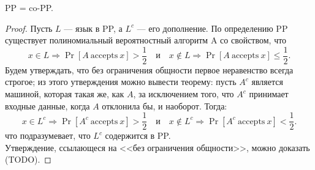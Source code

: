     \begin{Thm}
        PP = co-PP.
    \end{Thm}
    \begin{proof}
        Пусть $L$ --- язык в PP, а $L^c$ --- его дополнение. По определению PP существует полиномиальный вероятностный алгоритм A со свойством, что
        $$x \in L \Rightarrow \Pr [A \ {\text{accepts}} \ x] > {\frac{1}{2}} \quad {\text{и}} \quad x \not \in L \Rightarrow \Pr [A \ {\text{accepts}} \ x] \leq {\frac{1}{2}}.$$
        Будем утверждать, что без ограничения общности первое неравенство всегда строгое; из этого утверждения можно вывести теорему: пусть $A^{c}$ является машиной, которая такая же, как $A$, за исключением того, что $A^{c}$ принимает входные данные, когда $A$ отклонила бы, и наоборот. Тогда:
        $$x \in L^{c} \Rightarrow \Pr [A^{c} \ {\text{accepts}} \ x] > {\frac{1}{2}} \quad {\text{и}} \quad x \not \in L^{c} \Rightarrow \Pr [A^{c} \ {\text{accepts}} \ x] < {\frac{1}{2}}.$$
        что подразумевает, что $L^{c}$ содержится в PP.\\
        Утверждение, ссылающеся на <<без ограничения общности>>, можно доказать (TODO).
    \end{proof}

